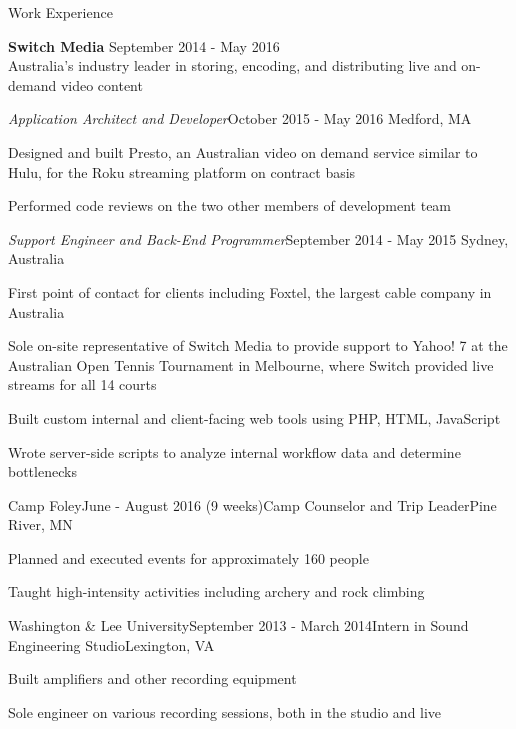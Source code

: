 \documentclass{resume}
\begin{document}
  \begin{rSection}{Work Experience}
    
    {\bf Switch Media} \hfill { September 2014 - May 2016}\\ 
    { Australia's industry leader in storing, encoding, and distributing live and on-demand video content} 

 \begin{addmargin}[2em]{0em}   
 
   \begin{rSubsection}{\normalfont\em Application Architect and Developer}{October 2015 - May 2016}{ }{\hfill Medford, MA}
    \item Designed and built Presto, an Australian video on demand service similar to Hulu, for the Roku streaming platform on contract basis
    \item Performed code reviews on the two other members of development team
    \end{rSubsection}
    
   \begin{rSubsection}{\normalfont\em Support Engineer and Back-End Programmer}{September 2014 - May 2015}{ }{Sydney, Australia}
    \item First point of contact for clients including Foxtel, the largest cable company in Australia
    \item Sole on-site representative of Switch Media to provide support to Yahoo! 7 at the Australian Open Tennis Tournament in Melbourne, where Switch provided live streams for all 14 courts
    \item Built custom internal and client-facing web tools using PHP, HTML, JavaScript
    \item Wrote server-side scripts to analyze internal workflow data and determine bottlenecks
    \end{rSubsection}
\end{addmargin}  
  
    \begin{rSubsection}{Camp Foley}{June - August 2016 (9 weeks)}{Camp Counselor and Trip Leader}{Pine River, MN}
    \item Planned and executed events for approximately 160 people
    \item Taught high-intensity activities including archery and rock climbing
    \end{rSubsection}

    \begin{rSubsection}{Washington \& Lee University}{September 2013 - March 2014}{Intern in Sound Engineering Studio}{Lexington, VA}
    \item Built amplifiers and other recording equipment
    \item Sole engineer on various recording sessions, both in the studio and live
    \end{rSubsection}
  
  \end{rSection}
  
\end{document}
